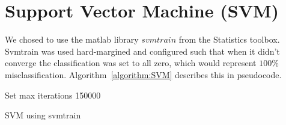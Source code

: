 \section{Support Vector Machine (SVM)}
We chosed to use the matlab library $svmtrain$ \citep{svmtrain_ref} from the Statistics toolbox. Svmtrain was used hard-margined and configured such that when it didn't converge the classification was set to all zero, which would represent $100\%$ misclassification. Algorithm~\ref{algorithm:SVM} describes this in pseudocode.\\
\begin{algorithm}[H]
\SetAlgoLined
{}

Set max iterations 150000 \\
 \caption{SVM using svmtrain}
 \label{algorithm:SVM}
\end{algorithm}


